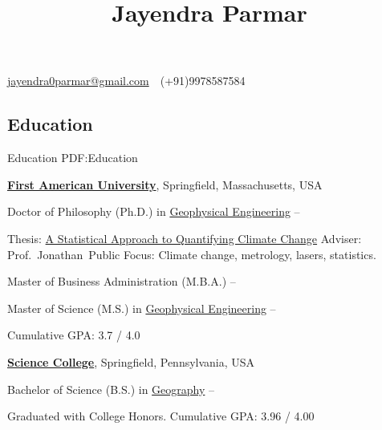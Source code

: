 \documentclass[letterpaper,MMMyyyy,nonstop]{simpleresumecv}
\newcommand{\CVAuthor}{Jayendra Parmar}
\begin{document}

\title{\CVAuthor}

\begin{subtitle}
\par
\href{mailto:jayendra0parmar@gmail.com}
{jayendra0parmar@gmail.com}
\,\SubBulletSymbol\,
(+91)9978587584
\,\SubBulletSymbol\,
\href{\CVWebpage}
{\CVWebpage}
\end{subtitle}

\begin{body}


\section
{Education}
{Education}
{PDF:Education}

\href{http://www.example.com/my-university}
{\textbf{First American University}},
Springfield, Massachusetts, USA

\GapNoBreak
\BulletItem
Doctor of Philosophy (Ph.D.) in
\href{http://www.example.com/my-department}
{Geophysical Engineering}
\hfill
{} --
\begin{detail}
\SubBulletItem
Thesis:
\href{http://www.example.com/my-phd-thesis}
{A Statistical Approach to Quantifying Climate Change}
\SubBulletItem
Adviser:
Prof.~Jonathan~Public
\SubBulletItem
Focus:
Climate change, metrology, lasers, statistics.
\end{detail}

\GapNoBreak
\BulletItem
Master of Business Administration (M.B.A.)
\hfill
{} --

\GapNoBreak
\BulletItem
Master of Science (M.S.) in
\href{http://www.example.com/my-department}
{Geophysical Engineering}
\hfill
{} --
\begin{detail}
\SubBulletItem
Cumulative GPA: 3.7 / 4.0
\end{detail}

\BigGap
\href{http://www.example.com/my-college}
{\textbf{Science College}},
Springfield, Pennsylvania, USA

\GapNoBreak
\BulletItem
Bachelor of Science (B.S.) in
\href{http://www.example.com/my-department}
{Geography}
\hfill
{} --
\begin{detail}
\SubBulletItem
Graduated with College Honors.
\SubBulletItem
Cumulative GPA: 3.96 / 4.00
\end{detail}


\end{body}
\end{document}
